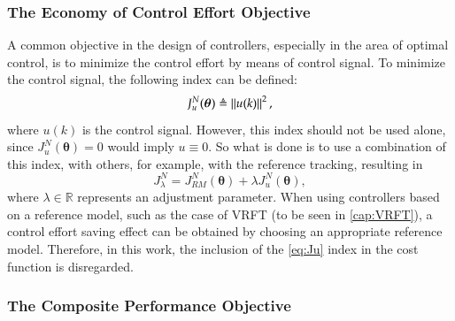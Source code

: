\subsubsection{The Economy of Control Effort Objective}%
\label{sub:the_economy_of_control_effot_objective}

A common objective in the design of controllers, especially in the area of optimal control, is to minimize the control effort by means of control signal. To minimize the control signal, the following index can be defined:
\begin{equation}
   J_u^N(\bm{\theta}) \triangleq \left\lVert u(k) \right\rVert^{2},
   \label{eq:Ju}
\end{equation}
 where $u(k)$ is the control signal. However, this index should not be used alone, since $J_u^N(\bm{\theta}) = 0$ would imply $u \equiv 0$. So what is done is to use a combination of this index, with others, for example, with the reference tracking, resulting in
\begin{equation}
   J_\lambda^N = J_{RM}^N(\bm{\theta}) + \lambda J_u^N(\bm{\theta}),
   \label{eq:Jl}
\end{equation}
where $\lambda \in \mathbb{R}$ represents an adjustment parameter.
When using controllers based on a reference model, such as the case of VRFT (to be seen in \ref{cap:VRFT}), a control effort saving effect can be obtained by choosing an appropriate reference model. Therefore, in this work, the inclusion of the \eqref{eq:Ju} index in the cost function is disregarded.


\subsubsection{The Composite Performance Objective}%
\label{sub:the_composite_performance_objective}

